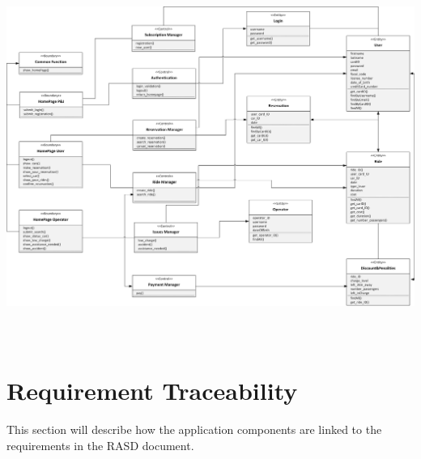 \documentclass{article}
\begin{document}
\begin{flushleft}
\vspace{1cm}
\includegraphics[width=15cm, height=12cm]{BCE} 
\vspace{1cm}
\newpage


\section{Requirement Traceability} %
This section will describe how the application components are linked to the requirements in the RASD document.
\begin{description}



\end{description}
\end{flushleft}
\end{document}
